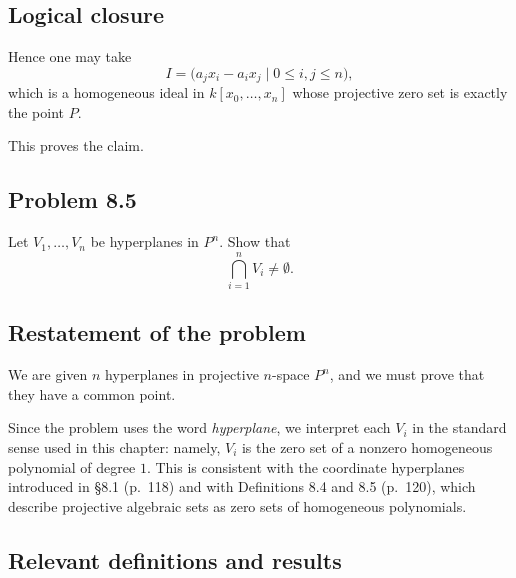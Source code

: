 \documentclass[a4paper,12pt,openany]{article}
\theoremstyle{plain}
\theoremstyle{definition}
\theoremstyle{remark}
\begin{document}
\subsection*{Logical closure}

Hence one may take
\[
I=\bigl(a_jx_i-a_ix_j \mid 0\le i,j\le n\bigr),
\]
which is a homogeneous ideal in $k[x_0,\dots,x_n]$ whose projective zero set is
exactly the point $P$.

This proves the claim.




\subsection*{Problem 8.5}

Let $V_1,\dots,V_n$ be hyperplanes in $P^n$. Show that
\[
\bigcap_{i=1}^n V_i \neq \emptyset.
\]

\subsection*{Restatement of the problem}

We are given $n$ hyperplanes in projective $n$-space $P^n$, and we must
prove that they have a common point.

Since the problem uses the word \emph{hyperplane}, we interpret each
$V_i$ in the standard sense used in this chapter: namely, $V_i$ is the zero
set of a nonzero homogeneous polynomial of degree $1$. This is consistent
with the coordinate hyperplanes introduced in \S8.1 (p.~118) and with
Definitions 8.4 and 8.5 (p.~120), which describe projective algebraic sets as
zero sets of homogeneous polynomials.

\subsection*{Relevant definitions and results}
\end{document}
